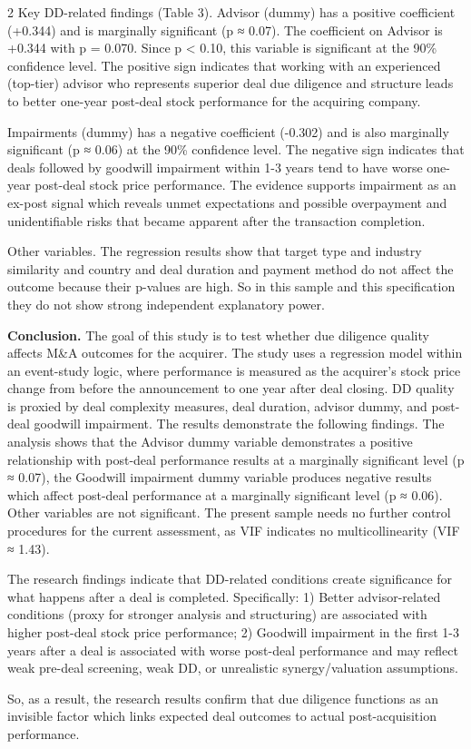 \begin{multicols}{2}
Key DD-related findings (Table 3). Advisor (dummy) has a positive
coefficient (+0.344) and is marginally significant (p ≈ 0.07). The
coefficient on Advisor is +0.344 with p = 0.070. Since p <{}
0.10, this variable is significant at the 90\% confidence level. The
positive sign indicates that working with an experienced (top-tier)
advisor who represents superior deal due diligence and structure leads
to better one-year post-deal stock performance for the acquiring
company.

Impairments (dummy) has a negative coefficient (-0.302) and is also
marginally significant (p ≈ 0.06) at the 90\% confidence level. The
negative sign indicates that deals followed by goodwill impairment
within 1-3 years tend to have worse one-year post-deal stock price
performance. The evidence supports impairment as an ex-post signal which
reveals unmet expectations and possible overpayment and unidentifiable
risks that became apparent after the transaction completion.

Other variables. The regression results show that target type and
industry similarity and country and deal duration and payment method do
not affect the outcome because their p-values are high. So in this
sample and this specification they do not show strong independent
explanatory power.

{\bfseries Conclusion.} The goal of this study is to test whether due
diligence quality affects M\&A outcomes for the acquirer. The study uses
a regression model within an event-study logic, where performance is
measured as the acquirer's stock price change from before the
announcement to one year after deal closing. DD quality is proxied by
deal complexity measures, deal duration, advisor dummy, and post-deal
goodwill impairment. The results demonstrate the following findings. The
analysis shows that the Advisor dummy variable demonstrates a positive
relationship with post-deal performance results at a marginally
significant level (p ≈ 0.07), the Goodwill impairment dummy variable
produces negative results which affect post-deal performance at a
marginally significant level (p ≈ 0.06). Other variables are not
significant. The present sample needs no further control procedures for
the current assessment, as VIF indicates no multicollinearity (VIF ≈
1.43).

The research findings indicate that DD-related conditions create
significance for what happens after a deal is completed. Specifically:
1) Better advisor-related conditions (proxy for stronger analysis and
structuring) are associated with higher post-deal stock price
performance; 2) Goodwill impairment in the first 1-3 years after a deal
is associated with worse post-deal performance and may reflect weak
pre-deal screening, weak DD, or unrealistic synergy/valuation
assumptions.

So, as a result, the research results confirm that due diligence
functions as an invisible factor which links expected deal outcomes to
actual post-acquisition performance.
\end{multicols}

